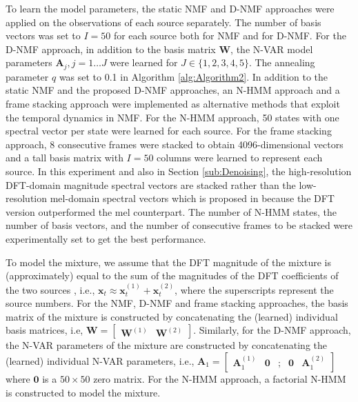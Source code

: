 \documentclass[10pt,twocolumn,twoside] {IEEEtran}
\begin{document}
To learn the model parameters, the static NMF and D-NMF approaches were applied on the observations of each source separately. The number of basis vectors was set to $I=50$ for each source both for NMF and for D-NMF. For the D-NMF approach, in addition to the basis matrix $\mathbf{W}$, the N-VAR model parameters $\mathbf{A}_j,j=1\ldots J$ were learned for $J\in\{1,2,3,4,5\}$. The annealing parameter $q$ was set to 0.1 in Algorithm \ref{alg:Algorithm2}. In addition to the static NMF and the proposed D-NMF approaches, an N-HMM approach \cite{Mysore2010} and a frame stacking approach \cite{Gemmeke2011a} were implemented as alternative methods that exploit the temporal dynamics in NMF. For the N-HMM approach, 50 states with one spectral vector per state were learned for each source. For the frame stacking approach, 8 consecutive frames were stacked to obtain 4096-dimensional vectors and a tall basis matrix with $I=50$ columns were learned to represent each source. In this experiment and also in Section \ref{sub:Denoising}, the high-resolution DFT-domain magnitude spectral vectors are stacked rather than the low-resolution mel-domain spectral vectors which is proposed in \cite{Gemmeke2011a} because the DFT version outperformed the mel counterpart. The number of N-HMM states, the number of basis vectors, and the number of consecutive frames to be stacked were experimentally set to get the best performance.

To model the mixture, we
assume that the DFT magnitude of the mixture is (approximately) equal to the sum of the magnitudes of the DFT coefficients of the two sources \cite{Smaragdis2007,Mysore2010,Mohammadiha2013d},
i.e., $\mathbf{x}_{t}\approx\mathbf{x}_{t}^{\left(1\right)}+\mathbf{x}_{t}^{\left(2\right)}$,
where the superscripts represent the source numbers. For the NMF, D-NMF and frame stacking approaches, the basis matrix of the mixture is constructed by concatenating
the (learned) individual basis matrices, i.e, $\mathbf{W}=\left[\begin{array}{cc}
\mathbf{W}^{\left(1\right)} & \mathbf{W}^{\left(2\right)}\end{array}\right]$. Similarly, for the D-NMF approach, the N-VAR parameters of the mixture are constructed by concatenating the (learned) individual N-VAR parameters, i.e., $\mathbf{A}_{1}=\left[\begin{array}{ccccc}
\mathbf{A}_{1}^{\left(1\right)} & \mathbf{0} & ; & \mathbf{0} & \mathbf{A}_{1}^{\left(2\right)}\end{array}\right]$ where $\mathbf{0}$ is a $50\times50$ zero matrix.  For the N-HMM approach, a factorial N-HMM \cite{Mysore2010} is constructed to model the mixture.
\end{document}
